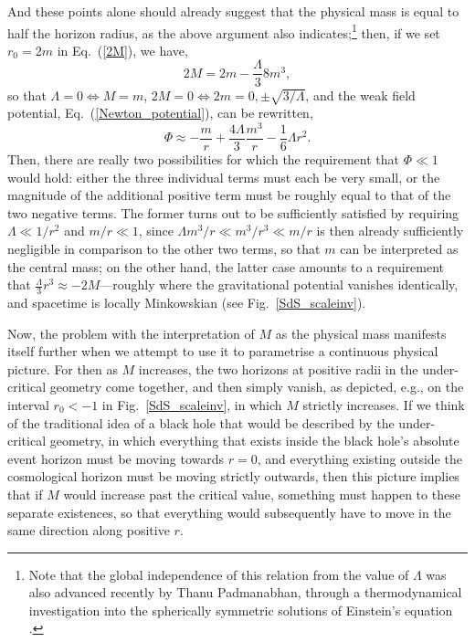 And these points alone should already suggest that the physical mass is equal to half the horizon radius, as the above argument also indicates;\footnote{Note that the global independence of this relation from the value of $\Lambda$ was also advanced recently by Thanu Padmanabhan, through a thermodynamical investigation into the spherically symmetric solutions of Einstein's equation \cite{Padmanabhan2002c}.} then, if we set $r_0=2m$ in Eq.~(\ref{2M}), we have,
\begin{equation}
2M=2m-\frac{\Lambda}{3}8m^3,\label{M_m}
\end{equation} 
so that $\Lambda=0\Leftrightarrow{M=m}$, $2M=0\Leftrightarrow{2m=0,\pm\sqrt{3/\Lambda}}$, and the weak field potential, Eq.~(\ref{Newton_potential}), can be rewritten,
\begin{equation}
\Phi\approx-\frac{m}{r}+\frac{4\Lambda}{3}\frac{m^3}{r}-\frac{1}{6}\Lambda{r}^2.\label{Newton_potential_m}
\end{equation}
Then, there are really two possibilities for which the requirement that $\Phi\ll1$ would hold: either the three individual terms must each be very small, or the magnitude of the additional positive term must be roughly equal to that of the two negative terms. The former turns out to be sufficiently satisfied by requiring $\Lambda\ll1/r^2$ and $m/r\ll1$, since $\Lambda{m}^3/r\ll{m^3}/r^3\ll{m/r}$ is then already sufficiently negligible in comparison to the other two terms, so that $m$ can be interpreted as the central mass; on the other hand, the latter case amounts to a requirement that $\frac{\Lambda}{3}r^3\approx-2M$---roughly where the gravitational potential vanishes identically, and spacetime is locally Minkowskian (see Fig.~\ref{SdS_scaleinv}).

Now, the problem with the interpretation of $M$ as the physical mass manifests itself further when we attempt to use it to parametrise a continuous physical picture. For then as $M$ increases, the two horizons at positive radii in the under-critical geometry come together, and then simply vanish, as depicted, e.g., on the interval $r_0<-1$ in Fig.~\ref{SdS_scaleinv}, in which $M$ strictly increases. If we think of the traditional idea of a black hole that would be described by the under-critical geometry, in which everything that exists inside the black hole's absolute event horizon must be moving towards $r=0$, and everything existing outside the cosmological horizon must be moving strictly outwards, then this picture implies that if $M$ would increase past the critical value, something must happen to these separate existences, so that everything would subsequently have to move in the same direction along positive $r$.


